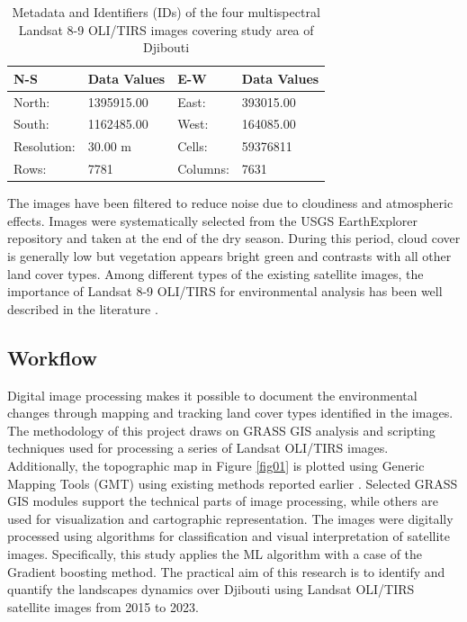 \documentclass[jimaging,article,submit,pdftex,moreauthors]{Definitions/mdpi}
\begin{document}
\begin{table}[H]
\caption{Metadata and Identifiers (IDs) of the four multispectral Landsat 8-9 OLI/TIRS images covering study area of Djibouti}\label{tab03}
\setlength\tabcolsep{0pt}
\begin{tabularx}{\textwidth}{ X X X X}
\textbf{N-S} & \textbf{Data Values} & \textbf{E-W} & \textbf{Data Values}\\
\midrule
	North: & 1395915.00 &  East: & 393015.00 \\
	South: &  1162485.00 &  West: & 164085.00 \\
	Resolution: &  30.00 m & Cells: & 59376811 \\
	Rows: & 7781 & Columns: & 7631 \\
\bottomrule
\end{tabularx}
\end{table}
 
 The images have been filtered to reduce noise due to cloudiness and atmospheric effects. Images were systematically selected from the USGS EarthExplorer repository and taken at the end of the dry season. During this period, cloud cover is generally low but vegetation appears bright green and contrasts with all other land cover types. Among different types of the existing satellite images, the importance of Landsat 8-9 OLI/TIRS for environmental analysis has been well described in the literature \cite{AKSOY20221072,NESARI2024101989,KUMAR2022100578}.

\subsection{Workflow}

Digital image processing makes it possible to document the environmental changes through mapping and tracking land cover types identified in the images. The methodology of this project draws on GRASS GIS analysis and scripting techniques used for processing a series of Landsat OLI/TIRS images. Additionally, the topographic map in Figure \ref{fig01} is plotted using Generic Mapping Tools (GMT) using existing methods reported earlier \cite{WRIGHT1998737,Lemenkova202217,9921513,Lemenkova202203,10537274}. Selected GRASS GIS modules support the technical parts of image processing, while others are used for visualization and cartographic representation. The images were digitally processed using algorithms for classification and visual interpretation of satellite images. Specifically, this study applies the ML algorithm with a case of the Gradient boosting method. The practical aim of this research is to identify and quantify the landscapes dynamics over Djibouti using Landsat OLI/TIRS satellite images from 2015 to 2023. 
\end{document}
